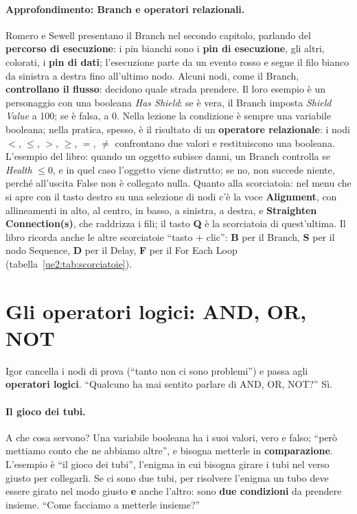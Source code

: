 \paragraph{Approfondimento: Branch e operatori relazionali.} Romero e Sewell presentano il
Branch nel secondo capitolo, parlando del \textbf{percorso di esecuzione}: i pin bianchi
sono i \textbf{pin di esecuzione}, gli altri, colorati, i \textbf{pin di dati};
l'esecuzione parte da un evento rosso e segue il filo bianco da sinistra a destra fino
all'ultimo nodo. Alcuni nodi, come il Branch, \textbf{controllano il flusso}: decidono
quale strada prendere. Il loro esempio è un personaggio con una booleana \emph{Has
Shield}: se è vera, il Branch imposta \emph{Shield Value} a 100; se è falsa, a 0. Nella
lezione la condizione è sempre una variabile booleana; nella pratica, spesso, è il
risultato di un \textbf{operatore relazionale}: i nodi $<$, $\leq$, $>$, $\geq$, $=$,
$\neq$ confrontano due valori e restituiscono una booleana. L'esempio del libro: quando
un oggetto subisce danni, un Branch controlla se \emph{Health} $\leq 0$, e in quel caso
l'oggetto viene distrutto; se no, non succede niente, perché all'uscita False non è
collegato nulla. Quanto alla scorciatoia: nel menu che si apre con il tasto destro su
una selezione di nodi c'è la voce \textbf{Alignment}, con allineamenti in alto, al
centro, in basso, a sinistra, a destra, e \textbf{Straighten Connection(s)}, che
raddrizza i fili; il tasto \textbf{Q} è la scorciatoia di quest'ultima. Il libro ricorda
anche le altre scorciatoie ``tasto + clic'': \textbf{B} per il Branch, \textbf{S} per il
nodo Sequence, \textbf{D} per il Delay, \textbf{F} per il For Each Loop
(tabella~\ref{ue2:tab:scorciatoie}).

\section{Gli operatori logici: AND, OR, NOT}
\label{ue2:sec:logici}

Igor cancella i nodi di prova (``tanto non ci sono problemi'') e passa agli
\textbf{operatori logici}. ``Qualcuno ha mai sentito parlare di AND, OR, NOT?'' Sì.

\paragraph{Il gioco dei tubi.} A che cosa servono? Una variabile booleana ha i suoi valori,
vero e falso; ``però mettiamo conto che ne abbiamo altre'', e bisogna metterle in
\textbf{comparazione}. L'esempio è ``il gioco dei tubi'', l'enigma in cui bisogna girare i
tubi nel verso giusto per collegarli. Se ci sono due tubi, per risolvere l'enigma un tubo
deve essere girato nel modo giusto \textbf{e} anche l'altro: sono \textbf{due
condizioni} da prendere insieme. ``Come facciamo a metterle insieme?''

